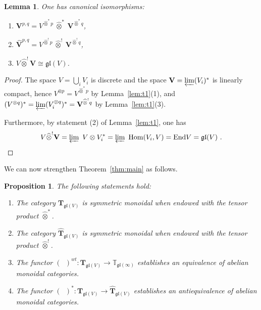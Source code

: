 \documentclass[12pt,reqno]{amsart}
\newtheorem{lem}[thm]{Lemma}
\newtheorem{prop}[thm]{Proposition}
\theoremstyle{definition}
\theoremstyle{remark}
\begin{document}
	\begin{lem}\label{lem:t2}
	One has canonical isomorphisms:
	
	\begin{enumerate}
	    \item[(a)]\label{aa}
	    $\mathbf{V}^{p,q} = V^{\widehat{\otimes}^\ast p}\ \widehat{\otimes}^\ast \  \mathbf{V}^{\widehat{\otimes}^\ast q}$,
	    \item[(b)] \label{bb}
	    $\widehat{\mathbf{V}}^{p,q} = V^{\widehat{\otimes}^! p}\ \widehat{\otimes}^! \  \mathbf{V}^{\widehat{\otimes}^! q}$,
	    \item[(c)] \label{cc}
	    $V\widehat{\otimes}^! \mathbf{V} \cong \mathfrak{gl}(V)$.
	\end{enumerate}
	\end{lem}
	\begin{proof}
	    The space $V = \bigcup_i V_i$ is discrete and the space $\mathbf{V} = \varprojlim (V_i)^\ast$ is linearly compact, hence 
	    $V^{\otimes p} = V^{\widehat{\otimes}^\ast p}$ by Lemma~\ref{lem:t1}(1), and 
	    $(V^{\otimes q})^\ast = \varprojlim (V_i^{\otimes q})^\ast = \mathbf{V}^{\widehat{\otimes}^! q}$ by Lemma~\ref{lem:t1}(3).
	    
	    Furthermore, by statement (2) of Lemma~\ref{lem:t1}, one has 
	    $$
	    V \widehat{\otimes}^! \mathbf{V} = \varprojlim \  V \otimes V_i^\ast = \varprojlim \ \mathrm{Hom}(V_i , V) = \mathrm{End}V = \mathfrak{gl}(V) \ .
	    $$
	\end{proof}
	
	We can now strengthen Theorem~\ref{thm:main} as follows.
	\begin{prop} \label{prop:t}
	    The following statements hold:
	    \begin{enumerate}
	        \item[(i)] The category $\mathbf{T}_{\mathfrak{gl}(V)}$ is symmetric monoidal when endowed with the tensor product $\widehat{\otimes}^\ast$.
	        
	        \item[(ii)] The category $\widehat{\mathbf{T}}_{\mathfrak{gl}(V)}$ is symmetric monoidal when endowed with the tensor product $\widehat{\otimes}^!$.
	        
	        \item[(iii)] The functor $(\phantom{a})^{wt} : \mathbf{T}_{\mathfrak{gl}(V)} \rightarrow \mathbb{T}_{\mathfrak{gl}(\infty)}$ establishes an equivalence of abelian monoidal categories.
	        
	        \item[(iv)] The functor $(\phantom{a})^\ast : \mathbf{T}_{\mathfrak{gl}(V)} \rightarrow \widehat{\mathbf{T}}_{\mathfrak{gl}(V)}$ establishes an antiequivalence of abelian monoidal categories.
	    \end{enumerate}
	\end{prop}
	
\end{document}
